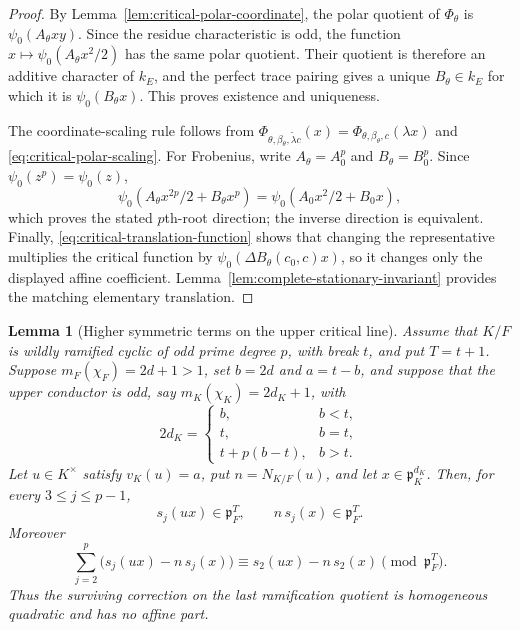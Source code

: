 \documentclass[11pt]{amsart}
\newtheorem{lemma}[theorem]{Lemma}
\theoremstyle{definition}
\theoremstyle{remark}
\newcommand{\p}{\mathfrak p}
\begin{document}
\begin{proof}
By Lemma~\ref{lem:critical-polar-coordinate}, the polar quotient of
$\Phi_\theta$ is $\psi_0(A_\theta xy)$.  Since the residue
characteristic is odd, the function
$x\mapsto\psi_0(A_\theta x^2/2)$ has the same polar quotient.
Their quotient is therefore an additive character of $k_E$, and the
perfect trace pairing gives a unique $B_\theta\in k_E$ for which it is
$\psi_0(B_\theta x)$.  This proves existence and uniqueness.

The coordinate-scaling rule follows from
$\Phi_{\theta,\beta_\theta,\widetilde\lambda c}(x)
 =\Phi_{\theta,\beta_\theta,c}(\lambda x)$ and
\eqref{eq:critical-polar-scaling}.  For Frobenius, write
$A_\theta=A_0^p$ and $B_\theta=B_0^p$.  Since
$\psi_0(z^p)=\psi_0(z)$,
\[
 \psi_0(A_\theta x^{2p}/2+B_\theta x^p)
 =\psi_0(A_0x^2/2+B_0x),
\]
which proves the stated $p$th-root direction; the inverse direction is
equivalent.  Finally,
\eqref{eq:critical-translation-function} shows that changing the
representative multiplies the critical function by
$\psi_0(\Delta B_\theta(c_0,c)x)$, so it changes only the displayed
affine coefficient.  Lemma~\ref{lem:complete-stationary-invariant}
provides the matching elementary translation.
\end{proof}

\begin{lemma}[Higher symmetric terms on the upper critical line]
\label{lem:odd-upper-higher-vanishing}
Assume that $K/F$ is wildly ramified cyclic of odd prime degree $p$,
with break $t$, and put $T=t+1$.  Suppose
$m_F(\chi_F)=2d+1>1$, set $b=2d$ and $a=t-b$, and suppose that the
upper conductor is odd, say $m_K(\chi_K)=2d_K+1$, with
\[
 2d_K=
 \begin{cases}
  b,&b<t,\\
  t,&b=t,\\
  t+p(b-t),&b>t.
 \end{cases}
\]
Let $u\in K^\times$ satisfy $v_K(u)=a$, put $n=N_{K/F}(u)$, and let
$x\in\p_K^{d_K}$.  Then, for every $3\le j\le p-1$,
\begin{equation}\label{eq:odd-upper-higher-terms-vanish}
 s_j(ux)\in\p_F^T,
 \qquad
 n\,s_j(x)\in\p_F^T.
\end{equation}
Moreover
\begin{equation}\label{eq:odd-upper-H-quadratic-reduction}
 \sum_{j=2}^{p}\bigl(s_j(ux)-n\,s_j(x)\bigr)
 \equiv s_2(ux)-n\,s_2(x)\pmod{\p_F^T}.
\end{equation}
Thus the surviving correction on the last ramification quotient is
homogeneous quadratic and has no affine part.
\end{lemma}
\end{document}

